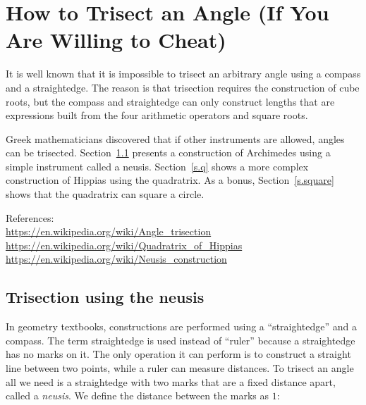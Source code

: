 
\chapter{How to Trisect an Angle (If You Are Willing to Cheat)}\label{c.trisect}

\vspace{-1ex}

It is well known that it is impossible to trisect an arbitrary angle using a compass and a straightedge. The reason is that trisection requires the construction of cube roots, but the compass and straightedge can only construct lengths that are expressions built from the four arithmetic operators and square roots.

Greek mathematicians discovered that if other instruments are allowed, angles can be trisected. Section~\ref{s.neusis} presents a construction of Archimedes using a simple instrument called a neusis. Section~\ref{s.q} shows a more complex construction of Hippias using the quadratrix. As a bonus, Section~\ref{s.square} shows that the quadratrix can square a circle.

References:\\
\url{https://en.wikipedia.org/wiki/Angle_trisection}\\
\url{https://en.wikipedia.org/wiki/Quadratrix_of_Hippias}\\
\url{https://en.wikipedia.org/wiki/Neusis_construction}


\vspace{-1ex}

\section{Trisection using the neusis}\label{s.neusis}

In geometry textbooks, constructions are performed using a ``straightedge'' and a compass. The term straightedge is used instead of ``ruler'' because a straightedge has no marks on it. The only operation it can perform is to construct a straight line between two points, while a ruler can measure distances. To trisect an angle all we need is a straightedge with two marks that are a fixed distance apart, called a \emph{neusis}. We define the distance between the marks as $1$:
\begin{center}
\end{center}

